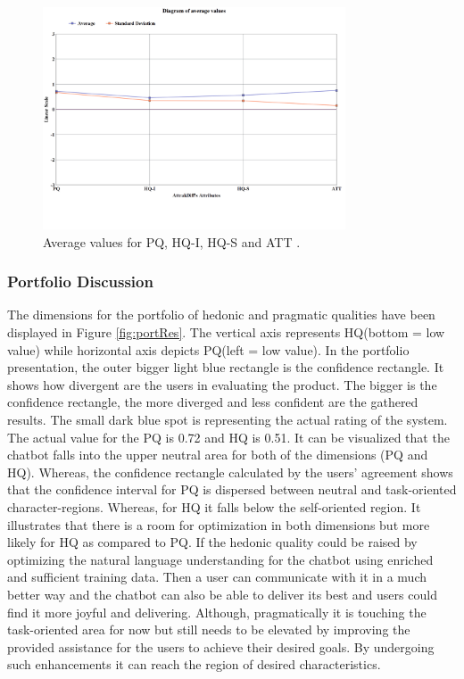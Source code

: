 \begin{figure}[!h]
    \centering
    \includegraphics[width=0.8\textwidth]{img/Diagram_for_Avg_Values_Updated.png}
    \caption{Average values for PQ, HQ-I, HQ-S and ATT \cite{attrakdiff}.}
    \label{fig:avgValAttrak}
\end{figure}

\subsubsection*{Portfolio Discussion}
The dimensions for the portfolio of hedonic and pragmatic qualities have been displayed in Figure \ref{fig:portRes}. The vertical axis represents HQ(bottom = low value) while horizontal axis depicts PQ(left = low value). In the portfolio presentation, the outer bigger light blue rectangle is the confidence rectangle. It shows how divergent are the users in evaluating the product. The bigger is the confidence rectangle, the more diverged and less confident are the gathered results. The small dark blue spot is representing the actual rating of the system. The actual value for the PQ is 0.72 and HQ is 0.51. It can be visualized that the chatbot falls into the upper neutral area for both of the dimensions (PQ and HQ). Whereas, the confidence rectangle calculated by the users' agreement shows that the confidence interval for PQ is dispersed between neutral and task-oriented character-regions. Whereas, for HQ it falls below the self-oriented region. It illustrates that there is a room for optimization in both dimensions but more likely for HQ as compared to PQ. If the hedonic quality could be raised by optimizing the natural language understanding for the chatbot using enriched and sufficient training data. Then a user can communicate with it in a much better way and the chatbot can also be able to deliver its best and users could find it more joyful and delivering. Although, pragmatically it is touching the task-oriented area for now but still needs to be elevated by improving the provided assistance for the users to achieve their desired goals. By undergoing such enhancements it can reach the region of desired characteristics.

